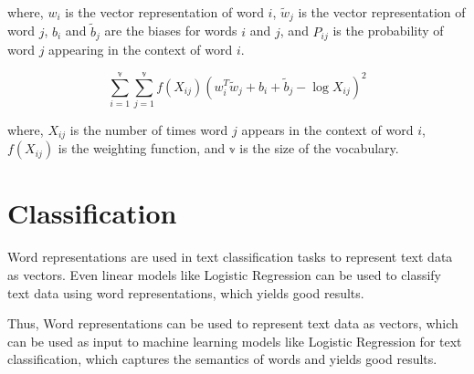 where, $w_i$ is the vector representation of word $i$, $\tilde{w}_j$ is the vector representation of word $j$, $b_i$ and $\tilde{b}_j$ are the biases for words $i$ and $j$, and $P_{ij}$ is the probability of word $j$ appearing in the context of word $i$.\\


$$
    \sum_{i=1}^{\mathbb{v}} \sum_{j=1}^{\mathbb{v}} f(X_{ij}) (w_i^T \tilde{w}_j + b_i + \tilde{b}_j - \log X_{ij})^2
$$

where, $X_{ij}$ is the number of times word $j$ appears in the context of word $i$, $f(X_{ij})$ is the weighting function, and $\mathbb{v}$ is the size of the vocabulary.

\section{Classification}

Word representations are used in text classification tasks to represent text data as vectors.
Even linear models like Logistic Regression can be used to classify text data using word representations, which yields good results. 



Thus, Word representations can be used to represent text data as vectors, which can be used as input to machine learning models like Logistic Regression for text classification, which captures the semantics of words and yields good results.